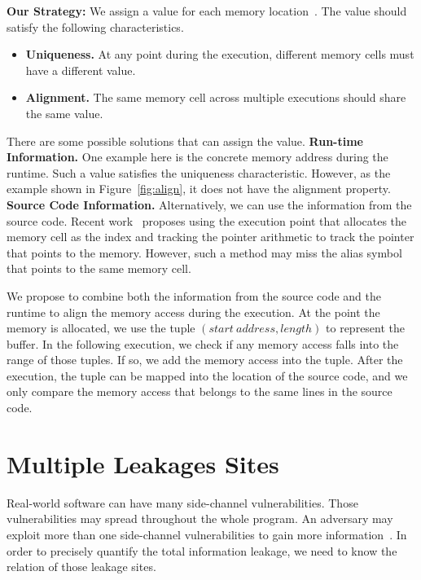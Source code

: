 \textbf{Our Strategy: } We assign a value for each memory location~\cite{sumner2010memory}. The value should satisfy the following characteristics.
\begin{itemize}
  \item \textbf{Uniqueness.} At any point during the execution, different memory cells must have a different value.
  \item \textbf{Alignment.} The same memory cell across multiple executions should share the same value.
\end{itemize}

There are some possible solutions that can assign the value.
\textbf{Run-time Information.} One example here is the concrete memory address during the runtime. Such a value satisfies the uniqueness characteristic. However, as the example shown in Figure~\ref{fig:align}, it does not have the alignment property.
\textbf{Source Code Information.} Alternatively, we can use the information from the source code. Recent work~\cite{sumner2010memory} proposes using the execution point that allocates the memory cell as the index and tracking the pointer arithmetic to track the pointer that points to the memory. However, such a method may miss the alias symbol that points to the same memory cell.

We propose to combine both the information from the source code and the runtime to align the memory access during the execution. At the point the memory is allocated, we use the tuple $(start\ address, length)$ to represent the buffer. In the following execution, we check if any memory access falls into the range of those tuples. If so, we add the memory access into the tuple. After the execution, the tuple can be mapped into the location of the source code, and we only compare the memory access that belongs to the same lines in the source code.

\section{Multiple Leakages Sites}
Real-world software can have many side-channel vulnerabilities. Those vulnerabilities may spread throughout the whole program. An adversary may exploit more than one side-channel vulnerabilities to gain more information~\cite{7163052, 191010}. In order to precisely quantify the
total information leakage, we need to know the relation of those leakage sites. 

